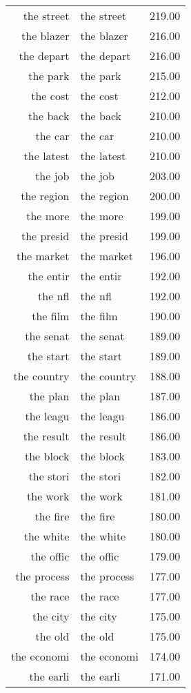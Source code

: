 \begin{table}[ht]
\begin{tabular}{rlr}
  the street & the street & 219.00 \\ 
  the blazer & the blazer & 216.00 \\ 
  the depart & the depart & 216.00 \\ 
  the park & the park & 215.00 \\ 
  the cost & the cost & 212.00 \\ 
  the back & the back & 210.00 \\ 
  the car & the car & 210.00 \\ 
  the latest & the latest & 210.00 \\ 
  the job & the job & 203.00 \\ 
  the region & the region & 200.00 \\ 
  the more & the more & 199.00 \\ 
  the presid & the presid & 199.00 \\ 
  the market & the market & 196.00 \\ 
  the entir & the entir & 192.00 \\ 
  the nfl & the nfl & 192.00 \\ 
  the film & the film & 190.00 \\ 
  the senat & the senat & 189.00 \\ 
  the start & the start & 189.00 \\ 
  the country & the country & 188.00 \\ 
  the plan & the plan & 187.00 \\ 
  the leagu & the leagu & 186.00 \\ 
  the result & the result & 186.00 \\ 
  the block & the block & 183.00 \\ 
  the stori & the stori & 182.00 \\ 
  the work & the work & 181.00 \\ 
  the fire & the fire & 180.00 \\ 
  the white & the white & 180.00 \\ 
  the offic & the offic & 179.00 \\ 
  the process & the process & 177.00 \\ 
  the race & the race & 177.00 \\ 
  the city & the city & 175.00 \\ 
  the old & the old & 175.00 \\ 
  the economi & the economi & 174.00 \\ 
  the earli & the earli & 171.00 \\ 

\end{tabular}
\end{table}
